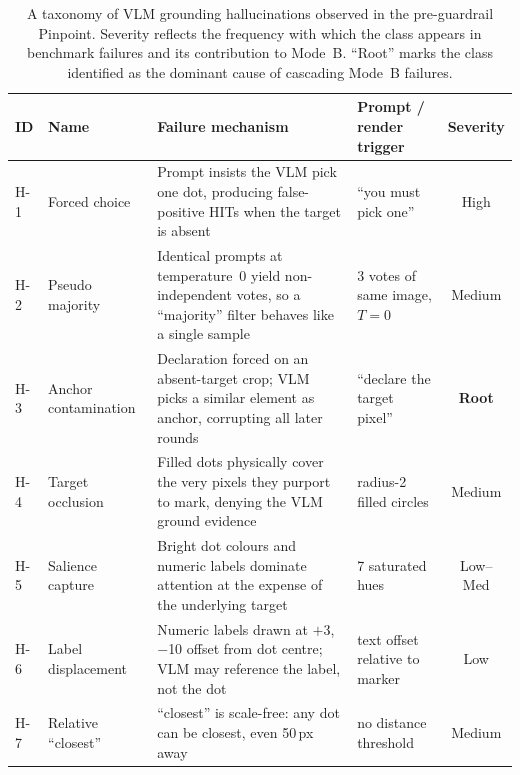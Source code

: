 \begin{table}[t]
  \centering
  \small
  \caption{A taxonomy of VLM grounding hallucinations observed in
    the pre-guardrail Pinpoint.  Severity reflects the frequency with which the
    class appears in benchmark failures and its contribution to
    Mode~B.  ``Root'' marks the class identified as the dominant
    cause of cascading Mode~B failures.}
  \label{tab:taxonomy}
  \begin{tabular}{@{}llp{6.2cm}p{3.5cm}c@{}}
    \toprule
    \textbf{ID} & \textbf{Name} & \textbf{Failure mechanism} &
    \textbf{Prompt / render trigger} & \textbf{Severity} \\
    \midrule
    H-1 & Forced choice         & Prompt insists the VLM pick one dot,
                                   producing false-positive HITs when
                                   the target is absent                       & ``you must pick one''          & High \\
    H-2 & Pseudo majority       & Identical prompts at temperature~0
                                   yield non-independent votes, so a
                                   ``majority'' filter behaves like a
                                   single sample                              & 3 votes of same image, $T{=}0$  & Medium \\
    H-3 & Anchor contamination  & Declaration forced on an absent-target
                                   crop; VLM picks a similar element as
                                   anchor, corrupting all later rounds        & ``declare the target pixel''   & \textbf{Root} \\
    H-4 & Target occlusion      & Filled dots physically cover the very
                                   pixels they purport to mark, denying
                                   the VLM ground evidence                   & radius-2 filled circles         & Medium \\
    H-5 & Salience capture      & Bright dot colours and numeric labels
                                   dominate attention at the expense of
                                   the underlying target                     & 7 saturated hues                & Low--Med \\
    H-6 & Label displacement    & Numeric labels drawn at $+$3,$-$10
                                   offset from dot centre; VLM may
                                   reference the label, not the dot          & text offset relative to marker  & Low \\
    H-7 & Relative ``closest''  & ``closest'' is scale-free: any dot can
                                   be closest, even 50\,px away               & no distance threshold           & Medium \\
    \bottomrule
  \end{tabular}
\end{table}

